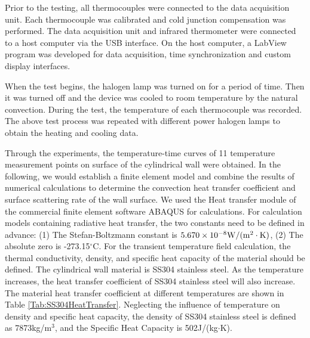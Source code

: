 Prior to the testing, all thermocouples were connected to the data acquisition unit. Each thermocouple was calibrated and cold junction compensation was performed.
The data acquisition unit and infrared thermometer were connected to a host computer via the USB interface.
On the host computer, a LabView program was developed for data acquisition, time synchronization and custom display interfaces.

When the test begins, the halogen lamp was turned on for a period of time. Then it was turned off and the device was cooled to room temperature by the natural convection.
During the test, the temperature of each thermocouple was recorded.
The above test process was repeated with different power halogen lamps to obtain the heating and cooling data.


Through the experiments, the temperature-time curves of 11 temperature measurement points on surface of the cylindrical wall were obtained.
In the following, we would establish a finite element model and combine the results of numerical calculations to determine the convection heat transfer coefficient and surface scattering rate of the wall surface.
We used the Heat transfer module of the commercial finite element software ABAQUS for calculations.
For calculation models containing radiative heat transfer, the two constants need to be defined in advance:
(1) The Stefan-Boltzmann constant is $5.670\times10^{-8}\rm{W}/(\rm{m}^{2}\cdot\rm{K})$,
(2) The absolute zero is -273.15$^{\circ}$C.
For the transient temperature field calculation, the thermal conductivity, density, and specific heat capacity of the material should be defined.
The cylindrical wall material is SS304 stainless steel. As the temperature increases, the heat transfer coefficient of SS304 stainless steel will also increase. The material heat transfer coefficient at different temperatures are shown in Table \ref{Tab:SS304HeatTransfer}.
Neglecting the influence of temperature on density and specific heat capacity, the density of SS304 stainless steel is defined as 7873kg/m$^3$, and the Specific Heat Capacity is 502J/(kg$\cdot$K).

